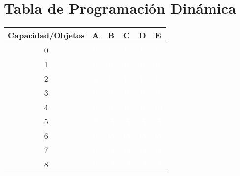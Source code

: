 \documentclass{article}
\begin{document}
\section*{Tabla de Programación Dinámica}
\begin{center}
\scriptsize
\begin{tabular}{|c|c|c|c|c|c|}
\hline
Capacidad/Objetos & A & B & C & D & E \\ \hline
0 & \cellcolor{rojo}\textcolor{white}{0} & \cellcolor{rojo}\textcolor{white}{0} & \cellcolor{rojo}\textcolor{white}{0} & \cellcolor{rojo}\textcolor{white}{0} & \cellcolor{rojo}\textcolor{white}{0} \\ \hline
1 & \cellcolor{rojo}\textcolor{white}{0} & \cellcolor{rojo}\textcolor{white}{0} & \cellcolor{rojo}\textcolor{white}{0} & \cellcolor{rojo}\textcolor{white}{0} & \cellcolor{rojo}\textcolor{white}{0} \\ \hline
2 & \cellcolor{rojo}\textcolor{white}{0} & \cellcolor{rojo}\textcolor{white}{0} & \cellcolor{rojo}\textcolor{white}{0} & \cellcolor{rojo}\textcolor{white}{0} & \cellcolor{rojo}\textcolor{white}{0} \\ \hline
3 & \cellcolor{rojo}\textcolor{white}{0} & \cellcolor{rojo}\textcolor{white}{0} & \cellcolor{rojo}\textcolor{white}{0} & \cellcolor{rojo}\textcolor{white}{0} & \cellcolor{rojo}\textcolor{white}{0} \\ \hline
4 & \cellcolor{rojo}\textcolor{white}{0} & \cellcolor{rojo}\textcolor{white}{0} & \cellcolor{rojo}\textcolor{white}{0} & \cellcolor{rojo}\textcolor{white}{0} & \cellcolor{verde}\textcolor{white}{10} \\ \hline
5 & \cellcolor{rojo}\textcolor{white}{0} & \cellcolor{verde}\textcolor{white}{15} & \cellcolor{rojo}\textcolor{white}{15} & \cellcolor{rojo}\textcolor{white}{15} & \cellcolor{rojo}\textcolor{white}{15} \\ \hline
6 & \cellcolor{rojo}\textcolor{white}{0} & \cellcolor{verde}\textcolor{white}{15} & \cellcolor{rojo}\textcolor{white}{15} & \cellcolor{rojo}\textcolor{white}{15} & \cellcolor{rojo}\textcolor{white}{15} \\ \hline
7 & \cellcolor{rojo}\textcolor{white}{0} & \cellcolor{verde}\textcolor{white}{15} & \cellcolor{rojo}\textcolor{white}{15} & \cellcolor{rojo}\textcolor{white}{15} & \cellcolor{rojo}\textcolor{white}{15} \\ \hline
8 & \cellcolor{rojo}\textcolor{white}{0} & \cellcolor{verde}\textcolor{white}{15} & \cellcolor{rojo}\textcolor{white}{15} & \cellcolor{rojo}\textcolor{white}{15} & \cellcolor{rojo}\textcolor{white}{15} \\ \hline

\end{tabular}
\end{center}
\end{document}
